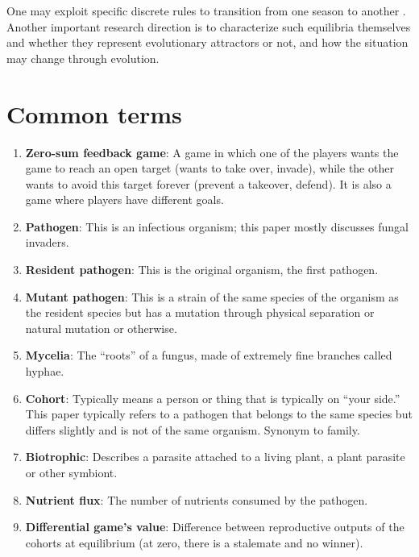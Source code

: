 \documentclass[11pt]{amsart}
\begin{document}
One may exploit specific discrete rules to
transition from one season to another \cite{MailleretLemesle2009,Akhmetzhanov2012}.
Another important research direction is to characterize such equilibria
themselves and whether they represent evolutionary attractors or not, and how the
situation may change through evolution.

\appendix

\section{Common terms}\label{terms}
\begin{enumerate}
    \item\label{term:zerosum} \textbf{Zero-sum feedback game}: A game in which one of the players wants the game to reach an open target (wants to take over, invade), while the other wants to avoid this target forever (prevent a takeover, defend)\cite{zerosumgame}. It is also a game where players have different goals.
    \item\label{term:pathogen} \textbf{Pathogen}: This is an infectious organism; this paper mostly discusses fungal invaders.
    \item\label{term:resident} \textbf{Resident pathogen}: This is the original organism, the first pathogen.
    \item\label{term:mutant} \textbf{Mutant pathogen}: This is a strain of the same species of the organism as the resident species but has a mutation through physical separation or natural mutation or otherwise.
    \item\label{term:mycelia} \textbf{Mycelia}: The ``roots'' of a fungus, made of extremely fine branches called hyphae. 
    \item\label{term:cohort} \textbf{Cohort}: Typically means a person or thing that is typically on ``your side.'' This paper typically refers to a pathogen that belongs to the same species but differs slightly and is not of the same organism. Synonym to family.
    \item\label{term:biotrohpic} \textbf{Biotrophic}: Describes a parasite attached to a living plant, a plant parasite or other symbiont. 
    \item\label{term:nutrientflux} \textbf{Nutrient flux}: The number of nutrients consumed by the pathogen.
    \item\label{term:differentialgame} \textbf{Differential game's value}:  Difference between reproductive outputs of the cohorts at equilibrium (at zero, there is a stalemate and no winner).

\end{enumerate}
\end{document}
